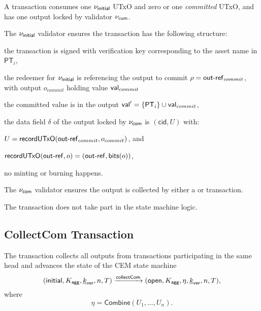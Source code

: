 A \mtxCom{} transaction consumes one $\nu_\mathsf{initial}$ UTxO and zero or one \emph{committed} UTxO, and has one output locked by validator $\nu_\mathsf{com}$. 

The $\nu_\mathsf{initial}$ validator ensures the transaction has the following structure:
\begin{menumerate}
    \item the transaction is signed with verification key corresponding to the asset name in $\mathsf{PT}_i$,
    \item the redeemer for $\nu_\mathsf{initial}$ is referencing the output to commit $ \rho = \mathsf{out\textsf{-}{}ref}_{commit}$, with output $o_{commit}$ holding value $\mathsf{val}_{commit}$
    \item the committed value is in the output $\mathsf{val}' = \{\mathsf{PT}_{i}\} \cup \mathsf{val}_{commit} $,
    \item the data field $\delta$ of the output locked by $\nu_\mathsf{com}$ is $(\mathsf{cid}, U)$ with:
    \begin{menumerate}
        \item $U = \mathsf{recordUTxO}(\mathsf{out\textsf{-}{}ref}_{commit},o_{commit})$, and 
        \item $\mathsf{recordUTxO} (\mathsf{out\textsf{-}{}ref}, o) = (\mathsf{out\textsf{-}{}ref}, \mathsf{bits}(o))$,
    \end{menumerate}        
    \item no minting or burning happens.
\end{menumerate}

The $\nu_\mathsf{com}$ validator ensures the output is collected by either a \mtxCCom{} or \mtxAbort{} transaction.
\begin{boxM}
The \mtxCom{} transaction does not take part in the state machine logic.
\end{boxM}

\subsection{CollectCom Transaction}



The \mtxCCom{} transaction collects all outputs from \mtxCom{} transactions participating in the same head and advances the state of the CEM state machine
$$
   (\mathsf{initial},K_{\mathsf{agg}},\underline{k}_{\mathsf{ver}},n,T) \xrightarrow{\mathsf{collectCom}} (\mathsf{open},K_{\mathsf{agg}},\eta,\underline{k}_{\mathsf{ver}},n,T),
$$
where
$$
\eta = \mathsf{Combine}(U_{1}, \ldots, U_{n}).
$$

